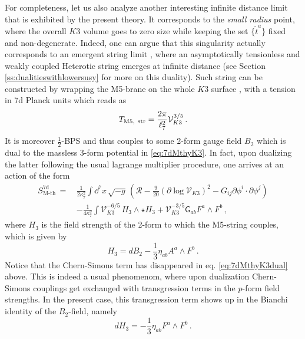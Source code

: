 For completeness, let us also analyze another interesting infinite distance limit that is exhibited by the present theory. It corresponds to the \emph{small radius} point, where the overall $K3$ volume goes to zero size while keeping the set $\{ \tilde{t}^a\}$ fixed and non-degenerate. Indeed, one can argue that this singularity actually corresponds to an emergent string limit \cite{Lee:2019wij}, where an asymptotically tensionless and weakly coupled Heterotic string emerges at infinite distance (see Section \ref{ss:dualitieswithlowersusy} for more on this duality). Such string can be constructed by wrapping the M5-brane on the whole $K3$ surface \cite{Cherkis:1997bx,Park_2009}, with a tension in 7d Planck units which reads as
%
\begin{equation}
	T_{\text{M5,\, str}} = \frac{2 \pi}{\ell_{7}^2}\mathcal{V}_{K3}^{3/5}\, .
\end{equation}
%
It is moreover $\frac12$-BPS and thus couples to some 2-form gauge field $B_2$ which is dual to the massless 3-form potential in \eqref{eq:7dMthyK3}. In fact, upon dualizing the latter following the usual lagrange multiplier procedure, one arrives at an action of the form
%
\begin{equation}\label{eq:7dMthyK3dual}
\begin{aligned}
	S_\text{M-th}^{\text{7d}}\, =\, & \frac{1}{2\kappa^2_7} \int \dd^{7}x\, \sqrt{-g}\,  \left( \mathcal{R} - \frac{9}{20} \left( \partial \log \mathcal{V}_{K3} \right)^2 - G_{i j} \partial \phi^i \cdot \partial \phi^j\right)\\
       &  -\frac{1}{4\kappa_{7}^2} \int \mathcal{V}_{K3}^{-6/5}\, H_3 \wedge \star H_3 + \mathcal{V}_{K3}^{-3/5} \mathsf{G}_{a b} F^a \wedge F^b\, ,
\end{aligned}
\end{equation}
%
where $H_3$ is the field strength of the 2-form to which the M5-string couples, which is given by
%
\begin{equation}\label{eq:H3fieldstrength}
	H_3= dB_2- \frac{1}{3}\eta_{a b} A^a \wedge F^b\, .
\end{equation}
%
Notice that the Chern-Simons term has disappeared in eq. \eqref{eq:7dMthyK3dual} above. This is indeed a usual phenomenom, where upon dualization Chern-Simons couplings get exchanged with transgression terms in the $p$-form field strengths. In the present case, this transgression term shows up in the Bianchi identity of the $B_2$-field, namely
%
\begin{equation}
	dH_3= - \frac{1}{3}\eta_{a b} F^a \wedge F^b\, .
\end{equation}
